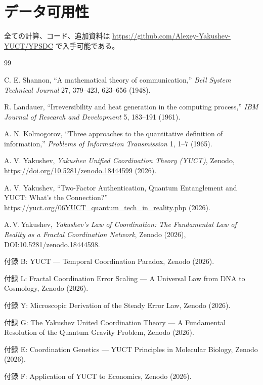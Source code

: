 \documentclass[12pt,a4paper]{article}
\theoremstyle{definition}
\theoremstyle{remark}
\begin{document}
	\section*{データ可用性}
	
	全ての計算、コード、追加資料は \url{https://github.com/Alexey-Yakushev-YUCT/YPSDC} で入手可能である。
	
	\begin{thebibliography}{99}
		
		C. E. Shannon, ``A mathematical theory of communication,'' \emph{Bell System Technical Journal} 27, 379–423, 623–656 (1948).
		
		R. Landauer, ``Irreversibility and heat generation in the computing process,'' \emph{IBM Journal of Research and Development} 5, 183–191 (1961).
		
		A. N. Kolmogorov, ``Three approaches to the quantitative definition of information,'' \emph{Problems of Information Transmission} 1, 1–7 (1965).
		
		A. V. Yakushev, \emph{Yakushev Unified Coordination Theory (YUCT)}, Zenodo, \url{https://doi.org/10.5281/zenodo.18444599} (2026).
		
		A. V. Yakushev, ``Two-Factor Authentication, Quantum Entanglement and YUCT: What's the Connection?'' \url{https://yuct.org/06YUCT_quantum_tech_in_reality.php} (2026).
		
		A.\,V.\,Yakushev, \emph{Yakushev's Law of Coordination: The Fundamental Law
			of Reality as a Fractal Coordination Network}, Zenodo (2026),
		DOI:10.5281/zenodo.18444598.
		
		付録 B: YUCT — Temporal Coordination Paradox, Zenodo (2026).
		
		付録 L: Fractal Coordination Error Scaling — A Universal Law from DNA to Cosmology, Zenodo (2026).
		
		付録 Y: Microscopic Derivation of the Steady Error Law, Zenodo (2026).
		
		付録 G: The Yakushev United Coordination Theory — A Fundamental Resolution of the Quantum Gravity Problem, Zenodo (2026).
		
		付録 E: Coordination Genetics — YUCT Principles in Molecular Biology, Zenodo (2026).
		
		付録 F: Application of YUCT to Economics, Zenodo (2026).
		

\end{thebibliography}
\end{document}
